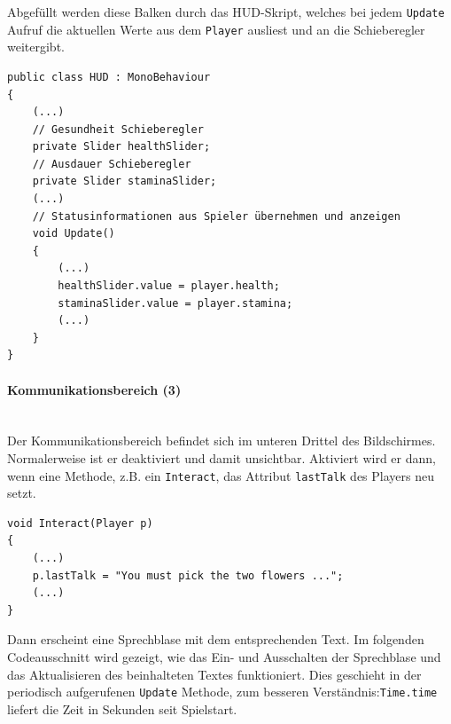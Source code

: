 Abgefüllt werden diese Balken durch das HUD-Skript, welches bei jedem \lstinline{Update} Aufruf die aktuellen Werte aus dem \lstinline{Player} ausliest und an die Schieberegler weitergibt.

\begin{lstlisting}[caption={Schieberegler aktualisieren}]
public class HUD : MonoBehaviour
{
	(...)
	// Gesundheit Schieberegler
	private Slider healthSlider;
	// Ausdauer Schieberegler
	private Slider staminaSlider;
	(...)
	// Statusinformationen aus Spieler übernehmen und anzeigen
	void Update()
	{
		(...)
		healthSlider.value = player.health;
		staminaSlider.value = player.stamina;
		(...)
	}
}
\end{lstlisting}

\paragraph{Kommunikationsbereich (3)}\mbox{} \\
Der Kommunikationsbereich befindet sich im unteren Drittel des Bildschirmes. 
Normalerweise ist er deaktiviert und damit unsichtbar.
Aktiviert wird er dann, wenn eine Methode, z.B. ein \lstinline{Interact}, das Attribut \lstinline{lastTalk} des Players neu setzt. 

\begin{lstlisting}[caption={Kommunikation setzen}]
void Interact(Player p)
{
	(...)
	p.lastTalk = "You must pick the two flowers ...";
	(...)
}
\end{lstlisting}

Dann erscheint eine Sprechblase mit dem entsprechenden Text. Im folgenden Codeausschnitt wird gezeigt, wie das Ein- und Ausschalten der Sprechblase und  das Aktualisieren des beinhalteten Textes funktioniert. Dies geschieht in der periodisch aufgerufenen \lstinline{Update} Methode, zum besseren Verständnis:\lstinline{Time.time} liefert die Zeit in Sekunden seit Spielstart.

